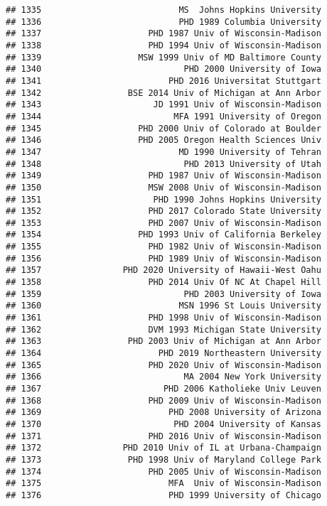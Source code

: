 \documentclass[
]{article}
\begin{document}
\begin{verbatim}
## 1335                           MS  Johns Hopkins University
## 1336                           PHD 1989 Columbia University
## 1337                     PHD 1987 Univ of Wisconsin-Madison
## 1338                     PHD 1994 Univ of Wisconsin-Madison
## 1339                   MSW 1999 Univ of MD Baltimore County
## 1340                            PHD 2000 University of Iowa
## 1341                         PHD 2016 Universitat Stuttgart
## 1342                 BSE 2014 Univ of Michigan at Ann Arbor
## 1343                      JD 1991 Univ of Wisconsin-Madison
## 1344                          MFA 1991 University of Oregon
## 1345                   PHD 2000 Univ of Colorado at Boulder
## 1346                   PHD 2005 Oregon Health Sciences Univ
## 1347                           MD 1990 University of Tehran
## 1348                            PHD 2013 University of Utah
## 1349                     PHD 1987 Univ of Wisconsin-Madison
## 1350                     MSW 2008 Univ of Wisconsin-Madison
## 1351                      PHD 1990 Johns Hopkins University
## 1352                     PHD 2017 Colorado State University
## 1353                     PHD 2007 Univ of Wisconsin-Madison
## 1354                   PHD 1993 Univ of California Berkeley
## 1355                     PHD 1982 Univ of Wisconsin-Madison
## 1356                     PHD 1989 Univ of Wisconsin-Madison
## 1357                PHD 2020 University of Hawaii-West Oahu
## 1358                     PHD 2014 Univ Of NC At Chapel Hill
## 1359                            PHD 2003 University of Iowa
## 1360                           MSN 1996 St Louis University
## 1361                     PHD 1998 Univ of Wisconsin-Madison
## 1362                     DVM 1993 Michigan State University
## 1363                 PHD 2003 Univ of Michigan at Ann Arbor
## 1364                       PHD 2019 Northeastern University
## 1365                     PHD 2020 Univ of Wisconsin-Madison
## 1366                            MA 2004 New York University
## 1367                        PHD 2006 Katholieke Univ Leuven
## 1368                     PHD 2009 Univ of Wisconsin-Madison
## 1369                         PHD 2008 University of Arizona
## 1370                          PHD 2004 University of Kansas
## 1371                     PHD 2016 Univ of Wisconsin-Madison
## 1372                PHD 2010 Univ of IL at Urbana-Champaign
## 1373                 PHD 1998 Univ of Maryland College Park
## 1374                     PHD 2005 Univ of Wisconsin-Madison
## 1375                         MFA  Univ of Wisconsin-Madison
## 1376                         PHD 1999 University of Chicago

\end{verbatim}
\end{document}
